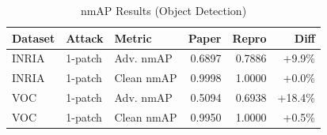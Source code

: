 \begin{table}[htbp]
\centering
\caption{nmAP Results (Object Detection)}
\label{tab:nmap}
\begin{tabular}{lllrrr}
\toprule
Dataset & Attack & Metric & Paper & Repro & Diff \\
\midrule
INRIA & 1-patch & Adv. nmAP & 0.6897 & 0.7886 & +9.9\% \\
INRIA & 1-patch & Clean nmAP & 0.9998 & 1.0000 & +0.0\% \\
\midrule
VOC & 1-patch & Adv. nmAP & 0.5094 & 0.6938 & +18.4\% \\
VOC & 1-patch & Clean nmAP & 0.9950 & 1.0000 & +0.5\% \\
\bottomrule
\end{tabular}
\end{table}
